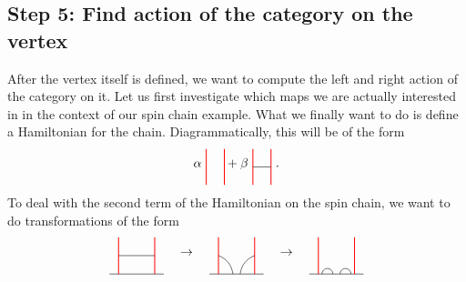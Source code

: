 \subsection*{Step 5: Find action of the category on the vertex} After the vertex itself is defined, we want to compute the left and right action of the category on it. Let us first investigate which maps we are actually interested in in the context of our spin chain example. What we finally want to do is define a Hamiltonian for the chain. Diagrammatically, this will be of the form
	\begin{equation*}
		\alpha\ \begin{tikzpicture}[scale=1,baseline=(current bounding box.center)]
			\draw [red, line width=0.25mm] (0,0) -- (0,1);
			\draw [red, line width=0.25mm] (0.5,0) -- (0.5,1);
		\end{tikzpicture}
		+\beta\ \begin{tikzpicture}[scale=1,baseline=(current bounding box.center)]
			\draw [red, line width=0.25mm] (0,0) -- (0,1);
			\draw [red, line width=0.25mm] (0.5,0) -- (0.5,1);
			\draw (0,0.5) -- (0.5,0.5);
		\end{tikzpicture}\ .
	\end{equation*}
To deal with the second term of the Hamiltonian on the spin chain, we want to do transformations of the form
	\begin{equation*}
		\begin{tikzpicture}[scale=1,baseline=(current bounding box.center)]
			\draw (-0.25,0) -- (1.25,0);
			\draw [red, line width=0.25mm] (0,0) -- (0,1);
			\draw [red, line width=0.25mm] (1,0) -- (1,1);
			\draw (0,0.5) -- (1,0.5);
		\end{tikzpicture} \hspace{10pt}\rightarrow\hspace{10pt}
		\begin{tikzpicture}[scale=1,baseline=(current bounding box.center)]
			\draw (-0.25,0) -- (1.25,0);
			\draw [red, line width=0.25mm] (0,0) -- (0,1);
			\draw [red, line width=0.25mm] (1,0) -- (1,1);
			\draw (0,0.5) to [bend left] (0.4,0);
			\draw (1,0.5) to [bend right] (0.6,0);
		\end{tikzpicture} \hspace{10pt}\rightarrow\hspace{10pt}
		\begin{tikzpicture}[scale=1,baseline=(current bounding box.center)]
			\draw (-0.25,0) -- (1.25,0);
			\draw [red, line width=0.25mm] (0,0) -- (0,1);
			\draw [red, line width=0.25mm] (1,0) -- (1,1);
			\draw ([shift=(180:0.15cm)]0.55,0) arc (0:180:0.15cm);
			\draw ([shift=(180:0.15cm)]1.05,0) arc (0:180:0.15cm);
		\end{tikzpicture}
	\end{equation*}
